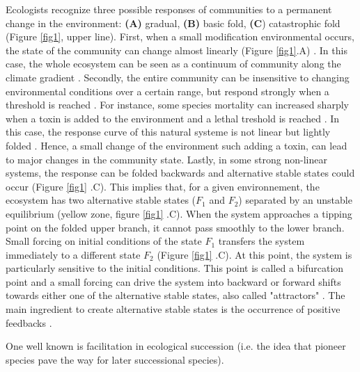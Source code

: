 Ecologists recognize three possible responses of communities to a permanent
change in the environment: \textbf{(A)} gradual, \textbf{(B)} basic fold,
\textbf{(C}) catastrophic fold \cite{Scheffer2001} (Figure \ref{fig1}, upper
line). First, when a small modification environmental occurs, the state of the
community can change almost linearly (Figure \ref{fig1}.A)
\cite{Scheffer2001,Scheffer2009}. In this case, the whole ecosystem can be
seen as a continuum of community along the climate gradient
\cite{Scheffer2001,Scheffer2009,scheffer2009critical}. Secondly, the entire
community can be insensitive to changing environmental conditions over a
certain range, but respond strongly when a threshold is reached
\cite{scheffer2009critical}. For instance, some species mortality can
increased sharply when a toxin is added to the environment and a lethal
treshold is reached \cite{scheffer2009critical}. In this case, the response
curve of this natural systeme is not linear but lightly folded . Hence, a
small change of the environment such adding a toxin, can lead to major changes
in the  community state. Lastly, in some strong non-linear systems, the
response can be folded backwards and alternative stable states could occur
(Figure \ref{fig1} .C). This implies that, for a given environnement, the
ecosystem has two alternative stable states ($F_1$ and $F_2$) separated by an
unstable equilibrium (yellow zone, figure \ref{fig1} .C). When the system
approaches a tipping point on the folded upper branch, it cannot pass smoothly
to the lower branch. Small forcing on initial conditions of the state $F_1$
transfers the system immediately to a different state $F_2$ (Figure \ref{fig1}
.C). At this point, the system is particularly sensitive to the initial
conditions. This point is called a bifurcation point and a small forcing can
drive the system into backward or forward shifts towards either one of the
alternative stable states, also called "attractors"
\cite{scheffer2009critical}. The main ingredient to create alternative stable
states is the occurrence of positive feedbacks
\cite{scheffer2009critical,Schroder2005}.


One well known is
facilitation in ecological succession (i.e. the idea that pioneer species pave
the way for later successional species). 


